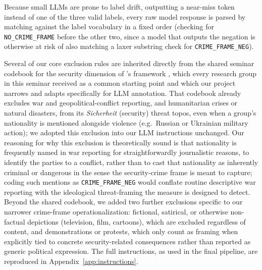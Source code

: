 \documentclass[a4paper,oneside,bibliography=totoc]{scrartcl}
\begin{document}
Because small LLMs are prone to label drift, outputting a near-miss token instead of one of the three valid labels, every raw model response is parsed by matching against the label vocabulary in a fixed order (checking for \texttt{NO\_CRIME\_FRAME} before the other two, since a model that outputs the negation is otherwise at risk of also matching a laxer substring check for \texttt{CRIME\_FRAME\_NEG}). 

Several of our core exclusion rules are inherited directly from the shared seminar codebook for the security dimension of \citeauthor{freudenthaler2025}'s framework \citep{freudenthalercodebook}, which every research group in this seminar received as a common starting point and which our project narrows and adapts specifically for LLM annotation. That codebook already excludes war and geopolitical-conflict reporting, and humanitarian crises or natural disasters, from its \emph{Sicherheit} (security) threat topos, even when a group's nationality is mentioned alongside violence (e.g.\ Russian or Ukrainian military action); we adopted this exclusion into our LLM instructions unchanged. Our reasoning for why this exclusion is theoretically sound is that nationality is frequently named in war reporting for straightforwardly journalistic reasons, to identify the parties to a conflict, rather than to cast that nationality as inherently criminal or dangerous in the sense the security-crime frame is meant to capture; coding such mentions as \texttt{CRIME\_FRAME\_NEG} would conflate routine descriptive war reporting with the ideological threat-framing the measure is designed to detect. Beyond the shared codebook, we added two further exclusions specific to our narrower crime-frame operationalization: fictional, satirical, or otherwise non-factual depictions (television, film, cartoons), which are excluded regardless of content, and demonstrations or protests, which only count as framing when explicitly tied to concrete security-related consequences rather than reported as generic political expression. The full instructions, as used in the final pipeline, are reproduced in Appendix~\ref{app:instructions}.
\end{document}
